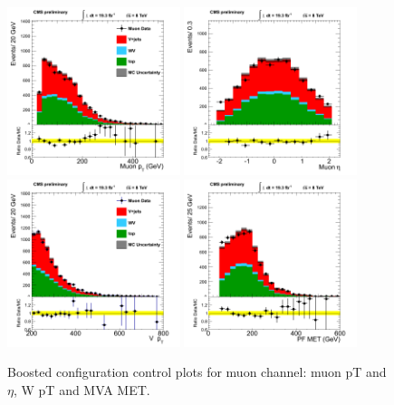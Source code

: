 \begin{figure}[htbp]
\centering
\includegraphics[width=0.45\textwidth]{figs/n-1_plots_mu/mu_W_muon_pt.png}
\includegraphics[width=0.45\textwidth]{figs/n-1_plots_mu/mu_W_muon_eta.png}
\includegraphics[width=0.45\textwidth]{figs/n-1_plots_mu/mu_W_pt.png}
\includegraphics[width=0.45\textwidth]{figs/n-1_plots_mu/mu_event_met_pfmet.png}\\
\caption{Boosted configuration control plots for muon channel: muon pT and $\eta$, W pT and MVA MET.}
\label{fig:control_boosted_mu}
\end{figure}


